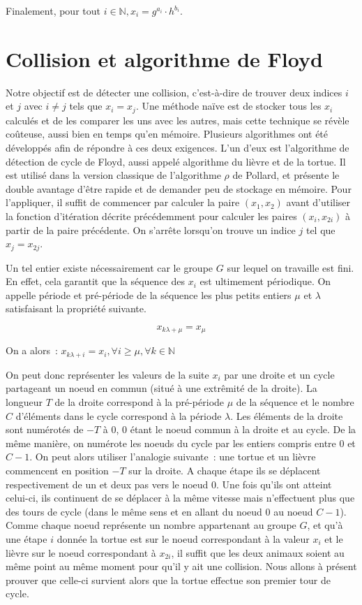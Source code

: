         Finalement, pour tout $i \in \mathbb{N}, x_i = g^{a_i} \cdot h^{b_i}$.

        \section{Collision et algorithme de Floyd}
        \label{chapter1:Floyd}
        Notre objectif est de détecter une collision, c'est-à-dire de trouver deux indices $i$ et $j$ avec $i \ne j$ tels que $x_i = x_j$. Une méthode naïve est de stocker tous les $x_i$ calculés et de les comparer les uns avec les autres, mais cette technique se révèle coûteuse, aussi bien en temps qu'en mémoire. Plusieurs algorithmes ont été développés afin de répondre à ces deux exigences. L'un d'eux est l'algorithme de détection de cycle de Floyd, aussi appelé algorithme du lièvre et de la tortue. Il est utilisé dans la version classique de l'algorithme \texorpdfstring{$\rho$}{Rho} de Pollard, et présente le double avantage d'être rapide et de demander peu de stockage en mémoire. Pour l'appliquer, il suffit de commencer par calculer la paire $(x_1, x_2)$ avant d'utiliser la fonction d'itération décrite précédemment pour calculer les paires $(x_i, x_{2i})$ à partir de la paire précédente. On s'arrête lorsqu'on trouve un indice $j$ tel que $x_j = x_{2j}$.

        Un tel entier existe nécessairement car le groupe $G$ sur lequel on travaille est fini. En effet, cela garantit que la séquence des $x_i$ est ultimement périodique. On appelle période et pré-période de la séquence les plus petits entiers $\mu$ et $\lambda$ satisfaisant la propriété suivante.

        \[ x_{k\lambda+\mu} = x_\mu \]

        On a alors~: $ x_{k\lambda+i} = x_i, \forall i \ge \mu, \forall k \in \mathbb{N}$

        On peut donc représenter les valeurs de la suite $x_i$ par une droite et un cycle partageant un noeud en commun (situé à une extrêmité de la droite). La longueur $T$ de la droite correspond à la pré-période $\mu$ de la séquence et le nombre $C$ d'éléments dans le cycle correspond à la période $\lambda$. Les éléments de la droite sont numérotés de $-T$ à $0$, $0$ étant le noeud commun à la droite et au cycle. De la même manière, on numérote les noeuds du cycle par les entiers compris entre $0$ et $C-1$. On peut alors utiliser l'analogie suivante~: une tortue et un lièvre commencent en position $-T$ sur la droite. A chaque étape ils se déplacent respectivement de un et deux pas vers le noeud $0$. Une fois qu'ils ont atteint celui-ci, ils continuent de se déplacer à la même vitesse mais n'effectuent plus que des tours de cycle (dans le même sens et en allant du noeud $0$ au noeud $C-1$). Comme chaque noeud représente un nombre appartenant au groupe $G$, et qu'à une étape $i$ donnée la tortue est sur le noeud correspondant à la valeur $x_i$ et le lièvre sur le noeud correspondant à $x_{2i}$, il suffit que les deux animaux soient au même point au même moment pour qu'il y ait une collision. Nous allons à présent prouver que celle-ci survient alors que la tortue effectue son premier tour de cycle.

